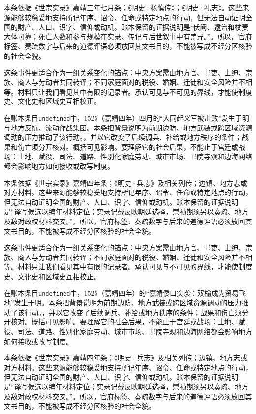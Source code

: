 本条依据《世宗实录》嘉靖三年七月条；《明史·杨慎传》；《明史·礼志》。这些来源能够较稳妥地支持所记年序、诏令、任命或特定地点的行动，但无法自动证明全国的财产、人口、识字、信仰或动机。账本保留的证据说明是“伏阙、逮治和杖责大体可靠；死亡人数和参与规模在实录、传记与后世叙事中有差异。”。所以，官府标签、奏疏数字与后来的道德评语必须放回其文书目的，不能被写成不经分区核验的社会全貌。

这条事件更适合作为一组关系变化的锚点：中央方案需由地方官、书吏、士绅、宗族、商人与劳动者共同转译；不同家庭面对的税役、婚姻、迁徙和安全风险并不相等。材料只让我们看见其中有限的记录者。承认可见与不可见的界线，才能使制度史、文化史和区域史互相校正。

在账本条目\texttt{undefined}中，1525（嘉靖四年）四月的“大同起义军被击败”发生于明与地方反抗、流动作战集团。本条把背景说明为前期边防、地方武装或跨区域资源调动的压力推动了该行动。，并以它改变了后续调兵、补给或地方秩序的条件；战果和伤亡须分开核对。概括可见影响。要理解它的社会后果，不能止于宫廷或战场：土地、赋役、司法、道路、性别化家庭劳动、城市市场、书院寺观和边海网络都会影响地方如何接收或改写制度。

本条依据《世宗实录》嘉靖四年条；《明史·兵志》及相关列传；边镇、地方志或对方材料。这些来源能够较稳妥地支持所记年序、诏令、任命或特定地点的行动，但无法自动证明全国的财产、人口、识字、信仰或动机。账本保留的证据说明是“译写候选以编年材料定位；实录记载反映朝廷选择，崇祯期须另以奏疏、地方及敌对政权材料交叉。”。所以，官府标签、奏疏数字与后来的道德评语必须放回其文书目的，不能被写成不经分区核验的社会全貌。

这条事件更适合作为一组关系变化的锚点：中央方案需由地方官、书吏、士绅、宗族、商人与劳动者共同转译；不同家庭面对的税役、婚姻、迁徙和安全风险并不相等。材料只让我们看见其中有限的记录者。承认可见与不可见的界线，才能使制度史、文化史和区域史互相校正。

在账本条目\texttt{undefined}中，1525（嘉靖四年）的“嘉靖倭口突袭：双榆成为贸易飞地”发生于明。本条把背景说明为前期边防、地方武装或跨区域资源调动的压力推动了该行动。，并以它改变了后续调兵、补给或地方秩序的条件；战果和伤亡须分开核对。概括可见影响。要理解它的社会后果，不能止于宫廷或战场：土地、赋役、司法、道路、性别化家庭劳动、城市市场、书院寺观和边海网络都会影响地方如何接收或改写制度。

本条依据《世宗实录》嘉靖四年条；《明史·兵志》及相关列传；边镇、地方志或对方材料。这些来源能够较稳妥地支持所记年序、诏令、任命或特定地点的行动，但无法自动证明全国的财产、人口、识字、信仰或动机。账本保留的证据说明是“译写候选以编年材料定位；实录记载反映朝廷选择，崇祯期须另以奏疏、地方及敌对政权材料交叉。”。所以，官府标签、奏疏数字与后来的道德评语必须放回其文书目的，不能被写成不经分区核验的社会全貌。

